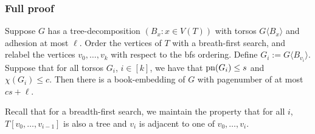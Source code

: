 \subsubsection{Full proof}
\begin{theorem}
	Suppose \(G\) has a tree-decomposition \((B_x: x \in V(T))\) with torsos \(G \langle B_x \rangle\) and adhesion at most \(\ell\). Order the vertices of \(T\) with a breath-first search, and relabel the vertices \(v_0, \ldots, v_k\) with respect to the bfs ordering. Define \(G_i := G \langle B_{v_i} \rangle \). Suppose that for all torsos \(G_i\), \(i \in [k]\), we have that \(\operatorname{pn}(G_i) \leq s\) and \(\chi(G_i) \leq c\). Then there is a book-embedding of \(G\) with pagenumber of at most \(cs + \ell\).
\end{theorem}
Recall that for a breadth-first search, we maintain the property that for all \(i\), \(T[v_0, \ldots, v_{i - 1}]\) is also a tree and \(v_i\) is adjacent to one of \(v_0, \ldots, v_{i}\).
